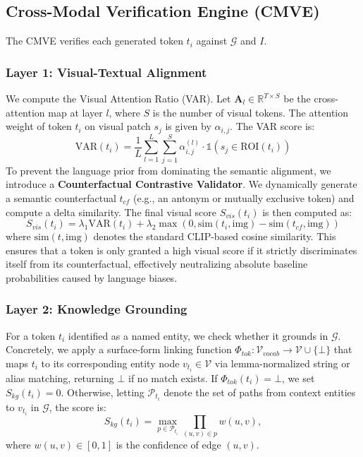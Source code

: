 \subsection{Cross-Modal Verification Engine (CMVE)}
The CMVE verifies each generated token $t_i$ against $\mathcal{G}$ and $I$.

\subsubsection{Layer 1: Visual-Textual Alignment}
We compute the Visual Attention Ratio (VAR). Let $\mathbf{A}_l \in \mathbb{R}^{T \times S}$ be the cross-attention map at layer $l$, where $S$ is the number of visual tokens. The attention weight of token $t_i$ on visual patch $s_j$ is given by $\alpha_{i,j}$. The VAR score is:
\begin{equation}
\text{VAR}(t_i) = \frac{1}{L} \sum_{l=1}^{L} \sum_{j=1}^{S} \alpha_{i,j}^{(l)} \cdot \mathbb{1}(s_j \in \text{ROI}(t_i))
\end{equation}
To prevent the language prior from dominating the semantic alignment, we introduce a \textbf{Counterfactual Contrastive Validator}. We dynamically generate a semantic counterfactual $t_{cf}$ (e.g., an antonym or mutually exclusive token) and compute a delta similarity. The final visual score $S_{vis}(t_i)$ is then computed as:
\begin{equation}
S_{vis}(t_i) = \lambda_1 \text{VAR}(t_i) + \lambda_2 \max\left(0, \text{sim}(t_i, \text{img}) - \text{sim}(t_{cf}, \text{img})\right)
\end{equation}
where $\text{sim}(t, \text{img})$ denotes the standard CLIP-based cosine similarity. This ensures that a token is only granted a high visual score if it strictly discriminates itself from its counterfactual, effectively neutralizing absolute baseline probabilities caused by language biases.

\subsubsection{Layer 2: Knowledge Grounding}
For a token $t_i$ identified as a named entity, we check whether it grounds in $\mathcal{G}$. Concretely, we apply a surface-form linking function $\Phi_{tok}: \mathcal{V}_{vocab} \to \mathcal{V} \cup \{\bot\}$ that maps $t_i$ to its corresponding entity node $v_{t_i} \in \mathcal{V}$ via lemma-normalized string or alias matching, returning $\bot$ if no match exists. If $\Phi_{tok}(t_i) = \bot$, we set $S_{kg}(t_i) = 0$. Otherwise, letting $\mathcal{P}_{t_i}$ denote the set of paths from context entities to $v_{t_i}$ in $\mathcal{G}$, the score is:
\begin{equation}
S_{kg}(t_i) = \max_{p \in \mathcal{P}_{t_i}} \prod_{(u,v) \in p} w(u,v),
\end{equation}
where $w(u,v) \in [0,1]$ is the confidence of edge $(u,v)$.

